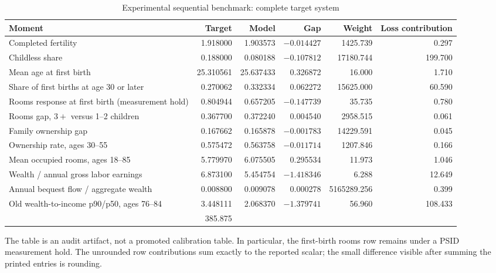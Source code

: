 \documentclass[11pt]{article}
\theoremstyle{definition}
\newcommand{\1}{\mathbf 1}
\begin{document}
\begin{table}[H]
\centering
\caption{Experimental sequential benchmark: complete target system}
\label{tab:full_fit}
\scriptsize
\begin{tabularx}{\textwidth}{>{\raggedright\arraybackslash}Xrrrrr}
\toprule
Moment & Target & Model & Gap & Weight & Loss contribution \\
\midrule
Completed fertility & 1.918000 & 1.903573 & $-0.014427$ & 1425.739 & 0.297 \\
Childless share & 0.188000 & 0.080188 & $-0.107812$ & 17180.744 & 199.700 \\
Mean age at first birth & 25.310561 & 25.637433 & 0.326872 & 16.000 & 1.710 \\
Share of first births at age 30 or later & 0.270062 & 0.332334 & 0.062272 & 15625.000 & 60.590 \\
Rooms response at first birth (measurement hold) & 0.804944 & 0.657205 & $-0.147739$ & 35.735 & 0.780 \\
Rooms gap, $3+$ versus 1--2 children & 0.367700 & 0.372240 & 0.004540 & 2958.515 & 0.061 \\
Family ownership gap & 0.167662 & 0.165878 & $-0.001783$ & 14229.591 & 0.045 \\
Ownership rate, ages 30--55 & 0.575472 & 0.563758 & $-0.011714$ & 1207.846 & 0.166 \\
Mean occupied rooms, ages 18--85 & 5.779970 & 6.075505 & 0.295534 & 11.973 & 1.046 \\
Wealth / annual gross labor earnings & 6.873100 & 5.454754 & $-1.418346$ & 6.288 & 12.649 \\
Annual bequest flow / aggregate wealth & 0.008800 & 0.009078 & 0.000278 & 5165289.256 & 0.399 \\
Old wealth-to-income p90/p50, ages 76--84 & 3.448111 & 2.068370 & $-1.379741$ & 56.960 & 108.433 \\
\midrule
\multicolumn{5}{r}{Exact current-contract loss} & 385.875 \\
\bottomrule
\end{tabularx}
\end{table}

The table is an audit artifact, not a promoted calibration table. In
particular, the first-birth rooms row remains under a PSID measurement hold.
The unrounded row contributions sum exactly to the reported scalar; the small
difference visible after summing the printed entries is rounding.
\end{document}
